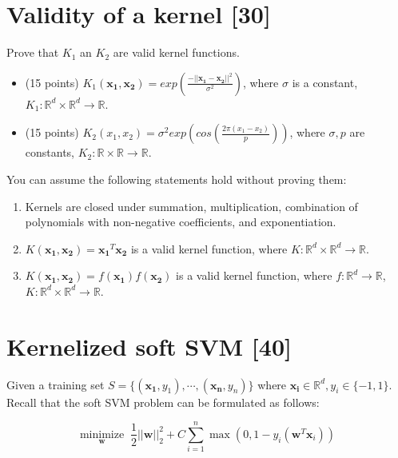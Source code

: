 \section{Validity of a kernel [30]}
\label{prb:hw3::prob1}
Prove that $K_1$ an $K_2$ are valid kernel functions.


\begin{itemize}[(a)]
    \item (15 points) $K_1(\bm{x_1},\bm{x_2})=exp(\frac{-||\bm{x_1}-\bm{x_2}||^2}{\sigma^2}) $, where $\sigma$ is a constant, $K_1: \mathbb{R}^d \times \mathbb{R}^d \rightarrow \mathbb{R}$.
\end{itemize}  
\begin{itemize}[(b)]
    \item (15 points) $K_2(x_1,x_2)=\sigma^2exp(cos(\frac{2\pi (x_1-x_2)}{p})) $, where $\sigma, p$ are constants, $K_2: \mathbb{R} \times \mathbb{R} \rightarrow \mathbb{R}$. 
\end{itemize}  
\noindent You can assume the following statements hold without proving them:

\begin{enumerate}[leftmargin=\parindent,align=left,labelwidth=\parindent,labelsep=0pt]
    \item Kernels are closed under summation, multiplication, combination of polynomials with non-negative coefficients, and exponentiation.
    \item $K(\bm{x_1},\bm{x_2})=\bm{x_1}^T\bm{x_2}$ is a valid kernel function, where $K: \mathbb{R}^d \times \mathbb{R}^d \rightarrow \mathbb{R}$.
    \item $K(\bm{x_1},\bm{x_2})=f(\bm{x_1})f(\bm{x_2})$ is a valid kernel function, where $f: \mathbb{R}^d \rightarrow \mathbb{R}$, $K: \mathbb{R}^d \times \mathbb{R}^d \rightarrow \mathbb{R}$.
\end{enumerate}




\newpage
\section{Kernelized soft SVM [40]}
Given a training set $S=\{(\bm{x_1},y_1),\cdots, (\bm{x_n},y_n)\}$ where $\bm{x_i}\in\mathbb{R}^d, y_i \in \{-1,1\}$. Recall that the soft SVM problem can be formulated as follows:

\begin{equation}
\label{regularized_hinge_loss}
\underset{\mathbf{w}}{\text{minimize}} \;\; \frac{1}{2}||\mathbf{w}||_2^2 + C \sum_{i=1}^n \max\left(0, 1 - y_{i} (\mathbf{w}^T\mathbf{x}_i) \right)
\end{equation}

